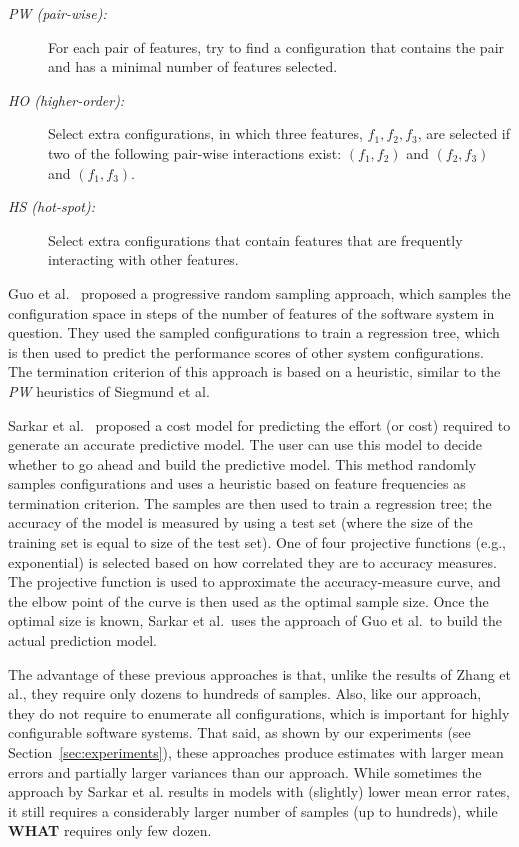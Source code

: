 \documentclass[smallextended]{svjour3}       %
\newcommand{\what}{{\bf WHAT}\xspace}
\begin{document}
\begin{description}
\item[{\em PW (pair-wise):}] For each pair of features, try to find a configuration that contains the pair and has a minimal number of features selected. 
\item[{\em HO (higher-order):}] Select extra configurations, in which three features, $f_1,f_2,f_3$, are selected if two of the following pair-wise interactions exist: $(f_1,f_2)$ and $(f_2,f_3)$ and $(f_1,f_3)$.
\item[{\em HS (hot-spot):}] Select extra configurations that contain features that are
frequently interacting with other features. 
\end{description}


Guo et al.~\cite{guo2013variability} proposed a progressive random sampling approach, which samples the configuration space in steps of the number of features of the software system in question. They used the sampled configurations to train a regression tree, which is then used to predict the performance scores of other system configurations. The termination criterion of this approach is based on a heuristic, similar to the {\em PW} heuristics of Siegmund et al. 

Sarkar et al.~\cite{sarkar2015cost} proposed a cost model for predicting the effort (or cost) required to generate an accurate predictive model. The user can use this model to decide whether to go ahead and build the predictive model. This method randomly samples configurations and uses a heuristic based on feature frequencies as termination criterion. The samples are then used to train a regression tree; the accuracy of the model is measured by using a test set (where the size of the training set is equal to size of the test set). One of four projective functions (e.g., exponential) is selected based on how correlated they are to  accuracy measures. The projective function is used to approximate the accuracy-measure curve, and the elbow point of the curve is then used as the optimal sample size. Once the optimal size is known, Sarkar et al.\ uses the approach of Guo et al.\ to build the actual prediction model.  


The advantage of these previous approaches is that, unlike  the results of Zhang et al., they require only dozens to hundreds of samples. Also, like our approach, they do not require to enumerate all configurations, which is important for highly configurable software systems. 
That said, as shown by our experiments (see Section~\ref{sec:experiments}), these approaches produce estimates with  larger mean errors and partially larger variances than our approach. While sometimes the approach by Sarkar et al. results in  models with (slightly)
lower mean error rates, it still requires a considerably larger number of samples (up to hundreds), while \what requires only few dozen.
 
\end{document}
